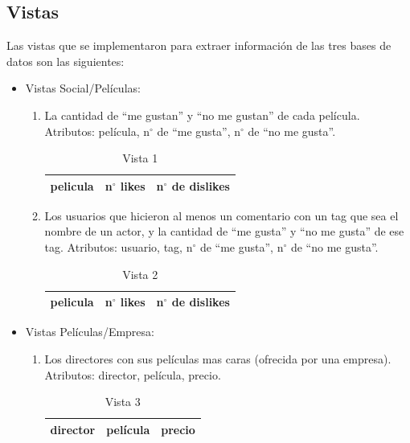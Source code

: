 \documentclass[12pt,letterpaper]{article}
\begin{document}
\subsection{Vistas}

Las vistas que se implementaron para extraer información de las tres bases de datos son las siguientes:

\begin{itemize}
	\item Vistas Social/Películas:
	
	\begin{enumerate}
		\item La cantidad de ``me gustan'' y ``no me gustan'' de cada película. Atributos: película, n$^\circ$ de ``me gusta'', n$^\circ$ de ``no me gusta''.
		
		\begin{table}[ht!]
			\centering
			\begin{tabular}{||c|l|l||} \hline 
				pelicula & n$^\circ$ likes & n$^\circ$ de dislikes\\ \hline
			\end{tabular}
			\caption {Vista 1}  
		\end{table}


		\item  Los usuarios que hicieron al menos un comentario con un tag que sea el nombre de un actor, y la cantidad de ``me gusta'' y ``no me gusta'' de ese tag. Atributos: usuario, tag, n$^\circ$ de ``me gusta'', n$^\circ$ de ``no me gusta''.
		
		\begin{table}[ht!]
			\centering
			\begin{tabular}{||c|l|l||} \hline 
				pelicula & n$^\circ$ likes & n$^\circ$ de dislikes\\ \hline
			\end{tabular}
			\caption {Vista 2}  
		\end{table}
		
	\end{enumerate}
	
	\item Vistas Películas/Empresa:
	
	\begin{enumerate}
		\item Los directores con sus películas mas caras (ofrecida por una empresa). Atributos: director, película, precio. 
		
		\begin{table}[ht!]
			\centering
			\begin{tabular}{||c|l|l||} \hline 
				director & película & precio \\ \hline
			\end{tabular}
			\caption {Vista 3}  
		\end{table}
		

\end{enumerate}
\end{itemize}
\end{document}
